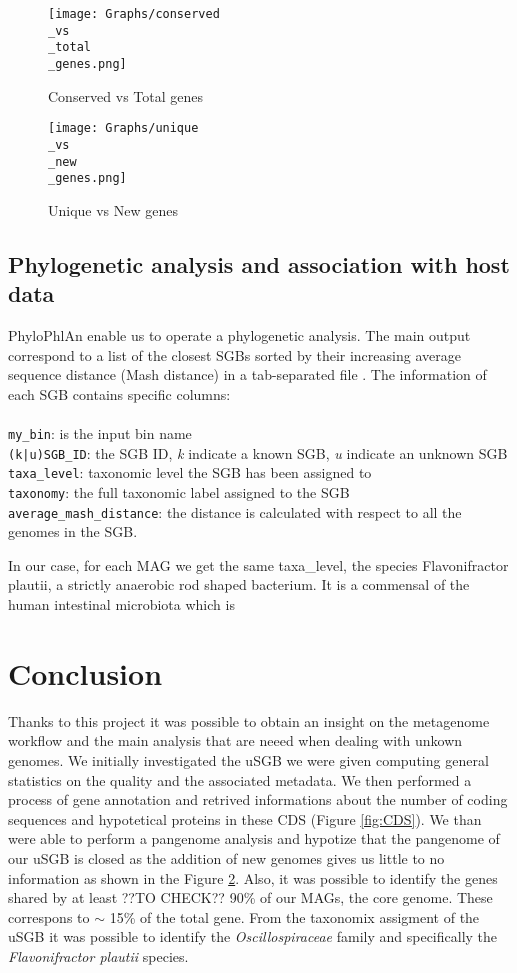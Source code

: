 \documentclass[a4paper,titlepage]{book}
\newcommand{\code}[1]{\colorbox{light-gray}{\texttt{#1}}}
\begin{document}
\begin{figure}[ht]
\centering
\texttt{[image: Graphs/conserved\\\_vs\\\_total\\\_genes.png]}
\caption{Conserved vs Total genes}
\label{fig:pangenome3}
\end{figure}

\begin{figure}[ht]
\centering
\texttt{[image: Graphs/unique\\\_vs\\\_new\\\_genes.png]}
\caption{Unique vs New genes}
\label{fig:pangenome4}
\end{figure}

\section{Phylogenetic analysis and association with host data}
PhyloPhlAn enable us to operate a phylogenetic analysis. The main output correspond to a list of the closest SGBs sorted by their increasing average sequence distance (Mash distance) in a tab-separated file \cite{PhyloGuide}. The information of each SGB contains specific columns:
\\
\\ \code{my\_bin}: is the input bin name
\\ \code{(k|u)SGB\_ID}: the SGB ID, \textit{k} indicate a known SGB, \textit{u} indicate an unknown SGB
\\ \code{taxa\_level}: taxonomic level the SGB has been assigned to
\\ \code{taxonomy}: the full taxonomic label assigned to the SGB
\\ \code{average\_mash\_distance}: the distance is calculated with respect to all the genomes in the SGB.

In our case, for each MAG we get the same taxa\_level, the species Flavonifractor plautii, a strictly anaerobic rod shaped bacterium. It is a commensal of the human intestinal microbiota which is  \cite{Plauti}


\chapter{Conclusion}
Thanks to this project it was possible to obtain an insight on the metagenome workflow and the main analysis that are neeed when dealing with unkown genomes.
We initially investigated the uSGB we were given computing general statistics on the quality and the associated metadata.
We then performed a process of gene annotation and retrived informations about the number of coding sequences and hypotetical proteins in these CDS (Figure \ref{fig:CDS}).
We than were able to perform a pangenome analysis and hypotize that the pangenome of our uSGB is closed as the addition of new genomes gives us little to no information as shown in the Figure \ref{fig:pangenome4}. Also, it was possible to identify the genes shared by at least ??TO CHECK?? 90\% of our MAGs, the core genome. These correspons to $\sim$ 15\% of the total gene.
From the taxonomix assigment of the uSGB it was possible to identify the \textit{Oscillospiraceae} family and specifically the \textit{Flavonifractor plautii} species.
\end{document}
